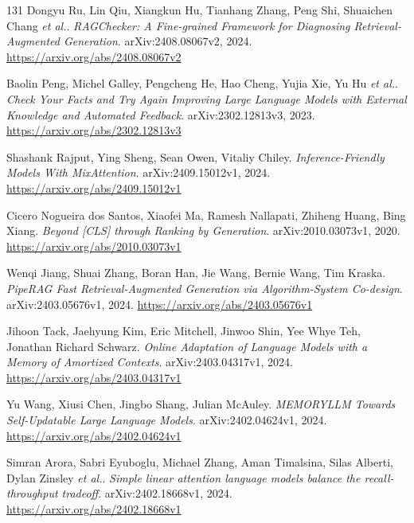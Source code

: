 \documentclass[11pt,a4paper]{article}
\begin{document}
\begin{thebibliography}{131}
Dongyu Ru, Lin Qiu, Xiangkun Hu, Tianhang Zhang, Peng Shi, Shuaichen Chang \emph{et al.}.
\newblock \emph{RAGChecker: A Fine-grained Framework for Diagnosing Retrieval-Augmented Generation}.
\newblock arXiv:2408.08067v2, 2024.
\newblock \url{https://arxiv.org/abs/2408.08067v2}

Baolin Peng, Michel Galley, Pengcheng He, Hao Cheng, Yujia Xie, Yu Hu \emph{et al.}.
\newblock \emph{Check Your Facts and Try Again Improving Large Language Models with External Knowledge and Automated Feedback}.
\newblock arXiv:2302.12813v3, 2023.
\newblock \url{https://arxiv.org/abs/2302.12813v3}

Shashank Rajput, Ying Sheng, Sean Owen, Vitaliy Chiley.
\newblock \emph{Inference-Friendly Models With MixAttention}.
\newblock arXiv:2409.15012v1, 2024.
\newblock \url{https://arxiv.org/abs/2409.15012v1}

Cicero Nogueira dos Santos, Xiaofei Ma, Ramesh Nallapati, Zhiheng Huang, Bing Xiang.
\newblock \emph{Beyond [CLS] through Ranking by Generation}.
\newblock arXiv:2010.03073v1, 2020.
\newblock \url{https://arxiv.org/abs/2010.03073v1}

Wenqi Jiang, Shuai Zhang, Boran Han, Jie Wang, Bernie Wang, Tim Kraska.
\newblock \emph{PipeRAG Fast Retrieval-Augmented Generation via Algorithm-System Co-design}.
\newblock arXiv:2403.05676v1, 2024.
\newblock \url{https://arxiv.org/abs/2403.05676v1}

Jihoon Tack, Jaehyung Kim, Eric Mitchell, Jinwoo Shin, Yee Whye Teh, Jonathan Richard Schwarz.
\newblock \emph{Online Adaptation of Language Models with a Memory of Amortized Contexts}.
\newblock arXiv:2403.04317v1, 2024.
\newblock \url{https://arxiv.org/abs/2403.04317v1}

Yu Wang, Xiusi Chen, Jingbo Shang, Julian McAuley.
\newblock \emph{MEMORYLLM Towards Self-Updatable Large Language Models}.
\newblock arXiv:2402.04624v1, 2024.
\newblock \url{https://arxiv.org/abs/2402.04624v1}

Simran Arora, Sabri Eyuboglu, Michael Zhang, Aman Timalsina, Silas Alberti, Dylan Zinsley \emph{et al.}.
\newblock \emph{Simple linear attention language models balance the recall-throughput tradeoff}.
\newblock arXiv:2402.18668v1, 2024.
\newblock \url{https://arxiv.org/abs/2402.18668v1}


\end{thebibliography}
\end{document}
